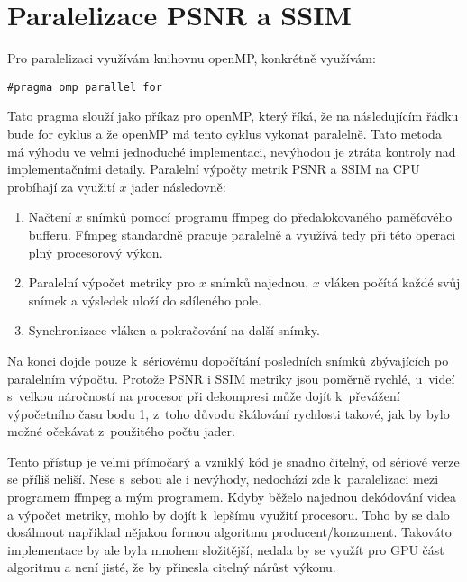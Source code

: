 \documentclass[thesis=M,czech]{FITthesis}[2016/06/26]
\begin{document}
\section{Paralelizace PSNR a SSIM}
Pro paralelizaci využívám knihovnu openMP, konkrétně využívám:
\begin{lstlisting}
#pragma omp parallel for 
\end{lstlisting}
Tato pragma slouží jako příkaz pro openMP, který říká, že na následujícím řádku bude for cyklus a že openMP má tento cyklus vykonat paralelně. 
Tato metoda má výhodu ve velmi jednoduché implementaci, nevýhodou je ztráta kontroly nad implementačními detaily.
Paralelní výpočty metrik PSNR a SSIM na CPU probíhají za využití $x$ jader následovně:
\begin{enumerate}
\item Načtení $x$ snímků pomocí programu ffmpeg do předalokovaného paměťového bufferu. Ffmpeg standardně pracuje paralelně a využívá tedy při této operaci plný procesorový výkon.
\item Paralelní výpočet metriky pro $x$ snímků najednou, $x$ vláken počítá každé svůj snímek a výsledek uloží do sdíleného pole.
\item Synchronizace vláken a pokračování na další snímky.
\end{enumerate}
Na konci dojde pouze k~sériovému dopočítání posledních snímků zbývajících po paralelním výpočtu. Protože PSNR i SSIM metriky jsou poměrně rychlé, u~videí s~velkou náročností na procesor při dekompresi může dojít k~převážení výpočetního času bodu 1, z~toho důvodu škálování rychlosti takové, jak by bylo možné očekávat z~použitého počtu jader.

Tento přístup je velmi přímočarý a vzniklý kód je snadno čitelný, od sériové verze se příliš neliší. Nese s~sebou ale i nevýhody, nedochází zde k~paralelizaci mezi programem ffmpeg a mým programem. Kdyby běželo najednou dekódování videa a výpočet metriky, mohlo by dojít k~lepšímu využití procesoru. Toho by se dalo dosáhnout napřiklad nějakou formou algoritmu producent/konzument\cite{prod_cons}. Takováto implementace by ale byla mnohem složitější, nedala by se využít pro GPU část algoritmu a není jisté, že by přinesla citelný nárůst výkonu.
\end{document}
